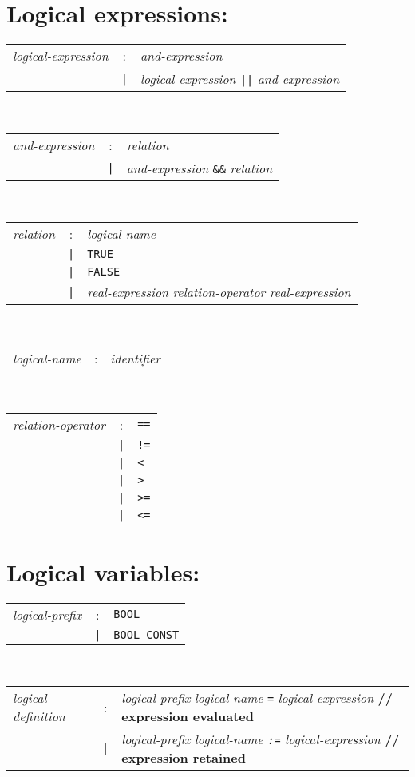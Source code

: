 \section*{Logical expressions:}
\begin{tabular}{p{4cm}cl}
\textit{logical-expression}
  &:& \textit{and-expression} \\
  &\texttt{|}& \textit{logical-expression} \texttt{||} \textit{and-expression}
\end{tabular}
\\
\begin{tabular}{p{4cm}cl}
\textit{and-expression}
  &:& \textit{relation} \\
  &\texttt{|}& \textit{and-expression} \texttt{\&\&} \textit{relation}
\end{tabular}
\\
\begin{tabular}{p{4cm}cl}
\textit{relation}
  &:& \textit{logical-name} \\
  &\texttt{|}& \texttt{TRUE} \\
  &\texttt{|}& \texttt{FALSE} \\
  &\texttt{|}& \textit{real-expression} \textit{relation-operator}
    \textit{real-expression}
\end{tabular}
\\
\begin{tabular}{p{4cm}cl}
\textit{logical-name}
  &:& \textit{identifier}
\end{tabular}
\\
\begin{tabular}{p{4cm}cl}
\textit{relation-operator}
  &:& \texttt{==} \\
  &\texttt{|}& \texttt{!=} \\
  &\texttt{|}& \texttt{<} \\
  &\texttt{|}& \texttt{>} \\
  &\texttt{|}& \texttt{>=} \\
  &\texttt{|}& \texttt{<=}
\end{tabular}

\section*{Logical variables:}
\begin{tabular}{p{4cm}cl}
\textit{logical-prefix}
  &:& \texttt{BOOL} \\
  &\texttt{|}& \texttt{BOOL CONST}
\end{tabular}
\\
\begin{tabular}{p{4cm}cl}
\textit{logical-definition}
  &:& \textit{logical-prefix} \textit{logical-name} \texttt{=}
    \textit{logical-expression} \textbf{// expression evaluated} \\
  &\texttt{|}& \textit{logical-prefix} \textit{logical-name \texttt{:=}}
    \textit{logical-expression} \textbf{// expression retained}
\end{tabular}
\\
\begin{tabular}{p{4cm}cl}
\end{tabular}


